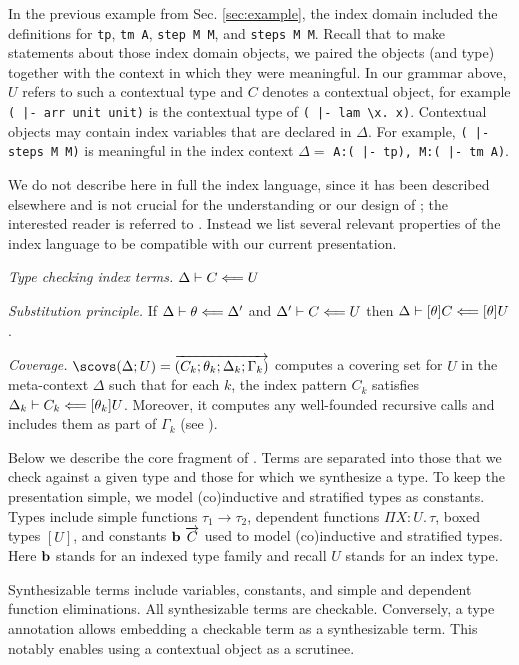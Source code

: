 In the previous example from Sec. \ref{sec:example}, the index domain
included the definitions for \lstinline!tp!, \lstinline!tm A!,
\lstinline!step M M!, and \lstinline!steps M M!. Recall that to make
statements about those index domain objects, we paired the objects
(and type) together with the context in which they were meaningful. In
our grammar above, $U$ refers to such a contextual type and $C$
denotes a contextual object, for example
\lstinline!( |- arr unit unit)! is the contextual type of
\lstinline!( |- lam \x. x)!.
Contextual objects may contain index
variables that are declared in $\Delta$. For example,
\lstinline!( |- steps M M)! is meaningful in the index context
$\Delta = $ \lstinline!A:( |- tp), M:( |- tm A)!.

We do not describe here in full the index language, since it has been
described elsewhere and is not crucial for the understanding or our
design of \Harpoon;
the interested reader is referred to \cite{Thibodeau:ICFP16,JacobRao:stratified2018}. %
Instead we list several relevant properties of the index language to be
compatible with our current presentation. %

\begin{description}
\item \emph{Type checking index terms.} $\Delta \vdash C \Longleftarrow U$
\item \emph{Substitution principle.} If $\Delta \vdash \theta \Longleftarrow \Delta'$ and $\Delta' \vdash C \Longleftarrow U$ then
  $\Delta \vdash [\theta]C \Longleftarrow [\theta]U$.
\item \emph{Coverage.}
  $\scovs (\Delta; U) = \vec{(C_k; \theta_k; \Delta_k; \Gamma_k)}$
  computes a covering set for $U$ in the meta-context $\Delta$
  such that for each $k$, the index pattern $C_k$ satisfies
  $\Delta_k \vdash C_k \Longleftarrow [\theta_k]U$.
  Moreover, it computes any well-founded recursive calls and includes them as
  part of $\Gamma_k$ (see \cite{Pientka:TLCA15}).
\end{description}


Below we describe the core fragment of \Beluga{}.
Terms are separated into those that we check against a given type and those for
which we synthesize a type.
To keep the presentation simple, we model (co)inductive and stratified types as
constants.
Types include simple functions $\tau_1 \to \tau_2$,
dependent functions $\Pi X{:}U.\,\tau$,
boxed types $[U]$, and constants $\textbf{b}~\overrightarrow{C}$ used to model (co)inductive
and stratified types.
Here $\textbf{b}$ stands for an indexed type family and recall $U$ stands for an
index type.
%

%
Synthesizable terms include variables, constants, and simple and dependent
function eliminations.
All synthesizable terms are checkable.
Conversely, a type annotation allows embedding a checkable term as a
synthesizable term.
This notably enables using a contextual object as a \tcases scrutinee.

